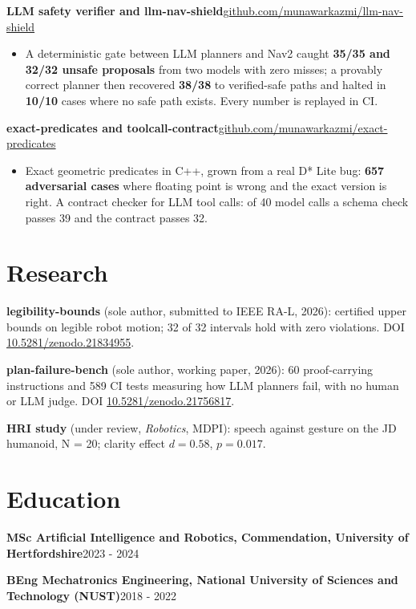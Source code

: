 \documentclass[10pt]{article}
\newcommand{\entry}[2]{{\textbf{#1}\hfill {\small #2}\par}}
\newcommand{\gap}{\vspace{3pt}}
\begin{document}
\gap
\entry{LLM safety verifier and llm-nav-shield}{\href{https://github.com/munawarkazmi/llm-nav-shield}{github.com/munawarkazmi/llm-nav-shield}}
\begin{itemize}
\item A deterministic gate between LLM planners and Nav2 caught \textbf{35/35 and 32/32 unsafe proposals} from two models
with zero misses; a provably correct planner then recovered \textbf{38/38} to verified-safe paths and halted in
\textbf{10/10} cases where no safe path exists. Every number is replayed in CI.
\end{itemize}

\gap
\entry{exact-predicates and toolcall-contract}{\href{https://github.com/munawarkazmi/exact-predicates}{github.com/munawarkazmi/exact-predicates}}
\begin{itemize}
\item Exact geometric predicates in C++, grown from a real D* Lite bug: \textbf{657 adversarial cases} where floating point is
wrong and the exact version is right. A contract checker for LLM tool calls: of 40 model calls a schema check
passes 39 and the contract passes 32.
\end{itemize}

\section{Research}
{\small
\textbf{legibility-bounds} (sole author, submitted to IEEE RA-L, 2026): certified upper bounds on legible robot motion;
32 of 32 intervals hold with zero violations. DOI \href{https://doi.org/10.5281/zenodo.21834955}{10.5281/zenodo.21834955}.\par
\textbf{plan-failure-bench} (sole author, working paper, 2026): 60 proof-carrying instructions and 589 CI tests measuring
how LLM planners fail, with no human or LLM judge. DOI \href{https://doi.org/10.5281/zenodo.21756817}{10.5281/zenodo.21756817}.\par
\textbf{HRI study} (under review, \emph{Robotics}, MDPI): speech against gesture on the JD humanoid, N = 20; clarity effect $d=0.58$, $p=0.017$.}

\section{Education}
\entry{MSc Artificial Intelligence and Robotics, Commendation, University of Hertfordshire}{2023 - 2024}
\entry{BEng Mechatronics Engineering, National University of Sciences and Technology (NUST)}{2018 - 2022}
\end{document}
